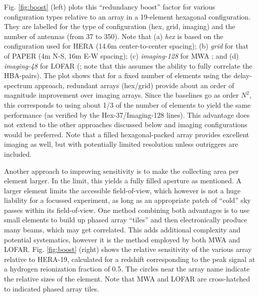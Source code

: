 \documentclass[preprint,11pt]{aastex}
\begin{document}
Fig. \ref{fig:boost} (left) plots this ``redundancy boost'' factor for various configuration types relative to an array in a 19-element hexagonal configuration.  They are labelled for the type of configuration (hex, grid, imaging) and the number of antennas (from 37 to 350).  Note that (a) {\em hex} is based on the configuration used for HERA (14.6m center-to-center spacing); (b) {\em grid} for that of PAPER (4m N-S, 16m E-W spacing); (c) {\em imaging-128} for MWA \citep{tingay_et_al2013}; and (d) {\em imaging-48} for LOFAR (\citealt{2013A&A...556A...2V}; note that this assumes the ability to fully correlate the HBA-pairs).  The plot shows that for a fixed number of elements using the delay-spectrum approach, redundant arrays (hex/grid) provide about an order of magnitude improvement over imaging arrays.  Since the baselines go as order $N^2$, this corresponds to using about 1/3 of the number of elements to yield the same performance (as verified by the Hex-37/Imaging-128 lines).  This advantage does not extend to the other approaches discussed below and imaging configurations would be preferred.  Note that a filled hexagonal-packed array provides excellent imaging as well, but with potentially limited resolution unless outriggers are included.

Another approach to improving sensitivity is to make the collecting area per element larger.  In the limit, this yields a fully filled aperture as mentioned.  A larger element limits the accessible field-of-view, which however is not a huge liability for a focussed experiment, as long as an appropriate patch of ``cold'' sky passes within its field-of-view.  One method combining both advantages is to use small elements to build up phased array ``tiles'' and then electronically produce many beams, which may get correlated.  This adds additional complexity and potential systematics, however it is the method employed by both MWA and LOFAR.  Fig. \ref{fig:boost} (right) shows the relative sensitivity of the various array relative to HERA-19, calculated for a redshift corresponding to the peak signal at a hydrogen reionization fraction of 0.5.  The circles near the array name indicate the relative sizes of the element.  Note that MWA and LOFAR are cross-hatched to indicated phased array tiles.
\end{document}
